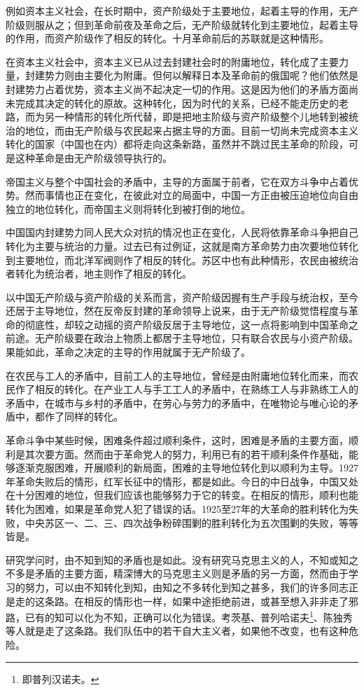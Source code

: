 \documentclass[UTF8, 12pt, a4paper]{ctexrep}
\begin{document}
例如资本主义社会，在长时期中，资产阶级处于主要地位，起着主导的作用，无产阶级则服从之；但到革命前夜及革命之后，无产阶级就转化到主要地位，起着主导的作用，而资产阶级作了相反的转化。十月革命前后的苏联就是这种情形。

在资本主义社会中，资本主义已从过去封建社会时的附庸地位，转化成了主要力量，封建势力则由主要化为附庸。但何以解释日本及革命前的俄国呢？他们依然是封建势力占着优势，资本主义尚不起决定一切的作用。这是因为他们的矛盾方面尚未完成其决定的转化的原故。这种转化，因为时代的关系，已经不能走历史的老路，而为另一种情形的转化所代替，即是把地主阶级与资产阶级整个儿地转到被统治的地位，而由无产阶级与农民起来占据主导的方面。目前一切尚未完成资本主义转化的国家（中国也在内）都将走向这条新路，虽然并不跳过民主革命的阶段，可是这种革命是由无产阶级领导执行的。

帝国主义与整个中国社会的矛盾中，主导的方面属于前者，它在双方斗争中占着优势。然而事情也正在变化，在彼此对立的局面中，中国一方正由被压迫地位向自由独立的地位转化，而帝国主义则将转化到被打倒的地位。

中国国内封建势力同人民大众对抗的情况也正在变化，人民将依靠革命斗争把自己转化为主要与统治的力量。过去已有过例证，这就是南方革命势力由次要地位转化到主要地位，而北洋军阀则作了相反的转化。苏区中也有此种情形，农民由被统治者转化为统治者，地主则作了相反的转化。

以中国无产阶级与资产阶级的关系而言，资产阶级因握有生产手段与统治权，至今还居于主导地位，然在反帝反封建的革命领导上说来，由于无产阶级觉悟程度与革命的彻底性，却较之动摇的资产阶级反居于主导地位，这一点将影响到中国革命之前途。无产阶级要在政治上物质上都居于主导地位，只有联合农民与小资产阶级。果能如此，革命之决定的主导的作用就属于无产阶级了。

在农民与工人的矛盾中，目前工人的主导地位，曾经是由附庸地位转化而来，而农民作了相反的转化。在产业工人与手工工人的矛盾中，在熟练工人与非熟练工人的矛盾中，在城市与乡村的矛盾中，在劳心与劳力的矛盾中，在唯物论与唯心论的矛盾中，都作了同样的转化。

革命斗争中某些时候，困难条件超过顺利条件，这时，困难是矛盾的主要方面，顺利是其次要方面。然而由于革命党人的努力，利用已有的若干顺利条件作基础，能够逐渐克服困难，开展顺利的新局面，困难的主导地位转化到以顺利为主导。1927年革命失败后的情形，红军长征中的情形，都是如此。今日的中日战争，中国又处在十分困难的地位，但我们应该也能够努力于它的转变。在相反的情形，顺利也能转化为困难，如果是革命党人犯了错误的话。1925至27年的大革命的胜利转化为失败，中央苏区一、二、三、四次战争粉碎围剿的胜利转化为五次围剿的失败，等等皆是。

研究学问时，由不知到知的矛盾也是如此。没有研究马克思主义的人，不知或知之不多是矛盾的主要方面，精深博大的马克思主义则是矛盾的另一方面，然而由于学习的努力，可以由不知转化到知，由知之不多转化到知之甚多，我们的许多同志正是走的这条路。在相反的情形也一样，如果中途拒绝前进，或甚至想入非非走了邪路，已有的知可以化为不知，正确可以化为错误。考茨基、普列哈诺夫\footnote{即普列汉诺夫。}、陈独秀等人就是走了这条路。我们队伍中的若干自大主义者，如果他不改变，也有这种危险。
\end{document}
